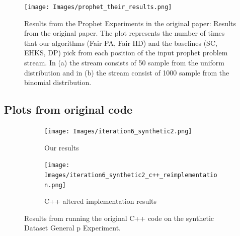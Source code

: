 \begin{figure}[H]
    \texttt{[image: Images/prophet\_their\_results.png]}
    \caption{Results from the Prophet Experiments in the original paper: Results from the original paper. The plot represents the number of times that our algorithms (Fair PA, Fair IID) and the baselines (SC, EHKS, DP) pick from each position of the input prophet problem stream. In (a) the stream consists of 50 sample from the uniform distribution and in (b) the stream consist of 1000 sample from the binomial distribution.}
    \label{fig:prophet_original_results}
\end{figure}


\subsection{Plots from original code}

\begin{figure}[H]
  \begin{minipage}{\linewidth}
      \centering
      \begin{minipage}{0.45\linewidth}
          \begin{figure}[H]
              \texttt{[image: Images/iteration6\_synthetic2.png]}
              \centering \par Our results
          \end{figure}
      \end{minipage}
      \begin{minipage}{0.45\linewidth}
          \begin{figure}[H]
              \texttt{[image: Images/iteration6\_synthetic2\_c++\_reimplementation.png]}
              \centering \par C++ altered implementation results
          \end{figure}
      \end{minipage}
  \end{minipage}
  \caption{Results from running the original C++ code on the synthetic Dataset General p Experiment.}
  \label{fig:secretary_experimentb_results}
\end{figure}

